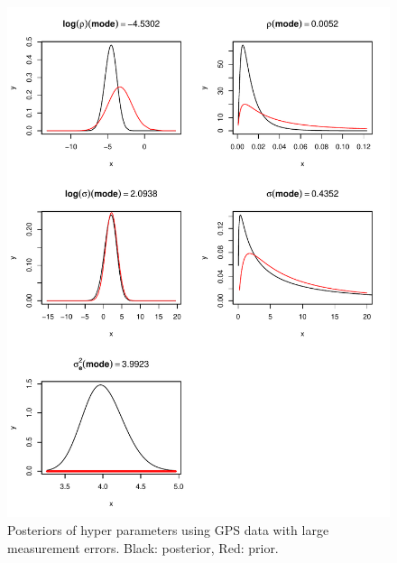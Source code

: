 \documentclass[a4paper,12pt]{article}
\begin{document}
\begin{figure}[htbp]
 \begin{center}
 \includegraphics{fig/sMesh_LErr_hyperpar.pdf}
 \end{center}
 \caption[Hyper parameter with large errors]{Posteriors of hyper parameters using GPS data with large measurement errors. Black: posterior, Red: prior.}
 \label{fig:2}
 \end{figure}
 
\end{document}
